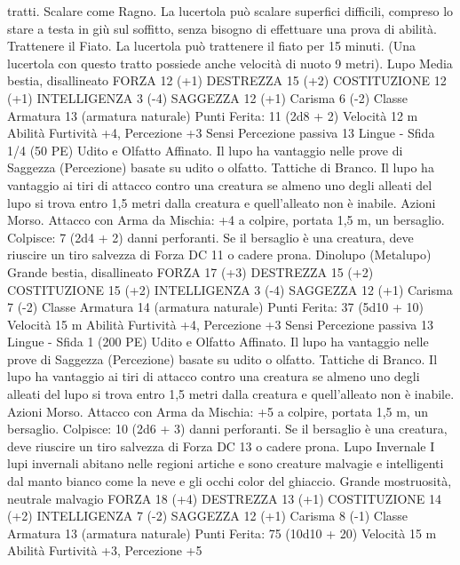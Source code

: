 \begin{multicols}{2}
tratti.
Scalare come Ragno. La lucertola può scalare superfici difficili,
compreso lo stare a testa in giù sul soffitto, senza bisogno di
effettuare una prova di abilità.
Trattenere il Fiato. La lucertola può trattenere il fiato per 15
minuti. (Una lucertola con questo tratto possiede anche velocità
di nuoto 9 metri).
Lupo
Media bestia, disallineato
FORZA 12 (+1)
DESTREZZA 15 (+2)
COSTITUZIONE 12 (+1)
INTELLIGENZA 3 (-4)
SAGGEZZA 12 (+1)
Carisma 6 (-2)
Classe Armatura 13 (armatura naturale)
\hspace*{0pt}\hfill{Punti Ferita}: 11 (2d8 + 2)
Velocità 12 m
Abilità Furtività +4, Percezione +3
Sensi Percezione passiva 13
Lingue -
Sfida 1/4 (50 PE)
Udito e Olfatto Affinato. Il lupo ha vantaggio nelle prove di
Saggezza (Percezione) basate su udito o olfatto.
Tattiche di Branco. Il lupo ha vantaggio ai tiri di attacco contro
una creatura se almeno uno degli alleati del lupo si trova entro
1,5 metri dalla creatura e quell’alleato non è inabile.
Azioni
Morso. Attacco con Arma da Mischia: +4 a colpire, portata 1,5
m, un bersaglio.
Colpisce: 7 (2d4 + 2) danni perforanti. Se il bersaglio è una
creatura, deve riuscire un tiro salvezza di Forza DC 11 o cadere
prona.
Dinolupo (Metalupo)
Grande bestia, disallineato
FORZA 17 (+3)
DESTREZZA 15 (+2)
COSTITUZIONE 15 (+2)
INTELLIGENZA 3 (-4)
SAGGEZZA 12 (+1)
Carisma 7 (-2)
Classe Armatura 14 (armatura naturale)
\hspace*{0pt}\hfill{Punti Ferita}: 37 (5d10 + 10)
Velocità 15 m
Abilità Furtività +4, Percezione +3
Sensi Percezione passiva 13
Lingue -
Sfida 1 (200 PE)
Udito e Olfatto Affinato. Il lupo ha vantaggio nelle prove di
Saggezza (Percezione) basate su udito o olfatto.
Tattiche di Branco. Il lupo ha vantaggio ai tiri di attacco contro
una creatura se almeno uno degli alleati del lupo si trova entro
1,5 metri dalla creatura e quell’alleato non è inabile.
Azioni
Morso. Attacco con Arma da Mischia: +5 a colpire, portata 1,5
m, un bersaglio.
Colpisce: 10 (2d6 + 3) danni perforanti. Se il bersaglio è una
creatura, deve riuscire un tiro salvezza di Forza DC 13 o cadere
prona.
Lupo Invernale
I lupi invernali abitano nelle regioni artiche e sono
creature malvagie e intelligenti dal manto bianco come
la neve e gli occhi color del ghiaccio.
Grande mostruosità, neutrale malvagio
FORZA 18 (+4)
DESTREZZA 13 (+1)
COSTITUZIONE 14 (+2)
INTELLIGENZA 7 (-2)
SAGGEZZA 12 (+1)
Carisma 8 (-1)
Classe Armatura 13 (armatura naturale)
\hspace*{0pt}\hfill{Punti Ferita}: 75 (10d10 + 20)
Velocità 15 m
Abilità Furtività +3, Percezione +5

\end{multicols}
